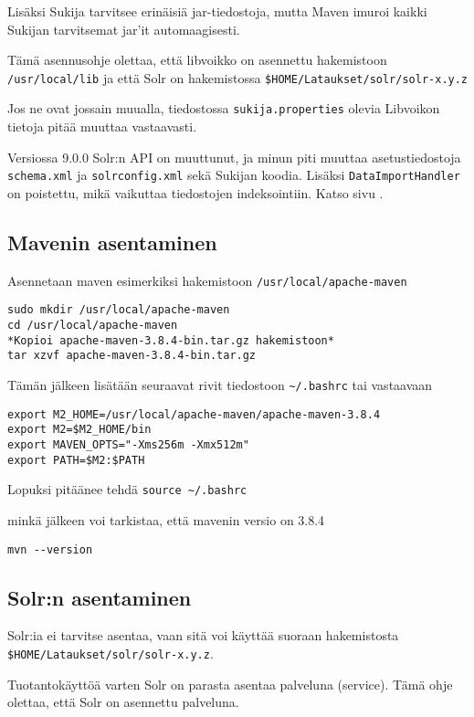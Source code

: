 \documentclass[12pt]{article}
\begin{document}
Lisäksi Sukija tarvitsee erinäisiä jar-tiedostoja, mutta Maven imuroi
kaikki Sukijan tarvitsemat jar'it automaagisesti.

Tämä asennusohje olettaa, että libvoikko on asennettu hakemistoon
\verb=/usr/local/lib= ja että Solr on hakemistossa
\verb=$HOME/Lataukset/solr/solr-x.y.z=

Jos ne ovat jossain muualla, tiedostossa \verb=sukija.properties=
olevia Libvoikon tietoja pitää muuttaa vastaavasti.

Versiossa 9.0.0 Solr:n API on muuttunut, ja minun piti muuttaa
asetustiedostoja \verb=schema.xml= ja \verb=solrconfig.xml= sekä
Sukijan koodia. Lisäksi \verb=DataImportHandler= on poistettu, mikä
vaikuttaa tiedostojen indeksointiin. Katso sivu .


\subsection*{Mavenin asentaminen}

Asennetaan maven esimerkiksi hakemistoon \verb=/usr/local/apache-maven=

\begin{verbatim}
sudo mkdir /usr/local/apache-maven
cd /usr/local/apache-maven
*Kopioi apache-maven-3.8.4-bin.tar.gz hakemistoon*
tar xzvf apache-maven-3.8.4-bin.tar.gz
\end{verbatim}

Tämän jälkeen lisätään seuraavat rivit tiedostoon \verb=~/.bashrc= tai
vastaavaan

\begin{verbatim}
export M2_HOME=/usr/local/apache-maven/apache-maven-3.8.4
export M2=$M2_HOME/bin
export MAVEN_OPTS="-Xms256m -Xmx512m"
export PATH=$M2:$PATH
\end{verbatim}

Lopuksi pitäänee tehdä \verb=source ~/.bashrc=

minkä jälkeen voi tarkistaa, että mavenin versio on 3.8.4

\verb=mvn --version=


\newpage
\subsection*{Solr:n asentaminen}

Solr:ia ei tarvitse asentaa, vaan sitä voi käyttää suoraan
hakemistosta \verb=$HOME/Lataukset/solr/solr-x.y.z=.

Tuotantokäyttöä varten Solr on parasta asentaa palveluna (service).
Tämä ohje olettaa, että Solr on asennettu palveluna.
\end{document}
